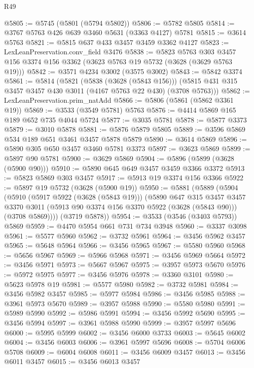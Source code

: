 \begin{lexlean}{R49}
\begin{coremodule}
@5805 := @5745 (@5801 (@5794 @5802))
@5806 := @5782 @5805
@5814 := @3767 @5763 @426 @639 @3460 @5631 (@3363 @4127) @5781
@5815 := @3614 @5763
@5821 := @5815 @637 @433 @3457 @3459 @3362 @4127
@5823 := LexLeanPreservation.conv_field @3476
@5838 := @5823
    @5763
    @303
    @3457
    @156
    @3374
    @156
    @3362
    (@3623 @5763 @19 @5732 (@3628 (@3629 @5763 @19)))
@5842 := @3571 @4234 @3002 (@3575 @3002)
@5843 := @5842 @3374
@5861 := @5814
    (@5821
      (@5838 (@3628 (@5843 @156)))
      (@5815 @431 @315 @3457 @3457 @430 @3011 (@4167 @5763 @22 @430) (@3708 @5763)))
@5862 := LexLeanPreservation.prim_natAdd
@5866 := @5806 (@5861 (@5862 @3361 @19))
@5869 := @3533 (@3549 @5781) @5763
@5876 := @4414 @5869 @165 @189 @652 @735 @4044 @5724
@5877 := @3035 @5781
@5878 := @5877 @3373
@5879 := @3010 @5878
@5881 := @5876 @5879 @5805
@5889 := @3596 @5869 @534 @189 @651 @3461 @3457 @5878 @5879
@5890 := @3614 @5869
@5896 := @5890 @305 @650 @3457 @3460 @5781 @3373
@5897 := @3623 @5869
@5899 := @5897 @90 @5781
@5900 := @3629 @5869
@5904 := @5896 (@5899 (@3628 (@5900 @90)))
@5910 := @5890 @645 @649 @3457 @3459 @3366 @3372
@5913 := @5823 @5869 @303 @3457
@5917 := @5913 @19 @3374 @156 @3366
@5922 := @5897 @19 @5732 (@3628 (@5900 @19))
@5950 := @5881
    (@5889
      (@5904
        (@5910
          (@5917 @5922 (@3628 (@5843 @19)))
          (@5890
            @647
            @315
            @3457
            @3457
            @3370
            @3011
            (@5913 @90 @3374 @156 @3370 @5922 (@3628 (@5843 @90)))
            (@3708 @5869))))
      (@3719 @5878))
@5954 := @3533 (@3546 (@3403 @5793)) @5869
@5959 := @4470 @5954 @661 @731 @734 @3948
@5960 := @3337 @3098
@5961 := @5577 @5960
@5962 := @3732 @5961
@5964 := @3456 @5962 @3457
@5965 := @5648 @5964
@5966 := @3456 @5965
@5967 := @5580 @5960
@5968 := @5656 @5967
@5969 := @5966 @5968
@5971 := @3456 @5969 @5664
@5972 := @3456 @5971
@5973 := @5667 @5967
@5975 := @3957 @5973 @5670
@5976 := @5972 @5975
@5977 := @3456 @5976
@5978 := @3360 @3101
@5980 := @5623 @5978 @19
@5981 := @5577 @5980
@5982 := @3732 @5981
@5984 := @3456 @5982 @3457
@5985 := @5977 @5984
@5986 := @3456 @5985
@5988 := @3961 @5973 @5670
@5989 := @3957 @5988
@5990 := @5580 @5980
@5991 := @5989 @5990
@5992 := @5986 @5991
@5994 := @3456 @5992 @5690
@5995 := @3456 @5994
@5997 := @3961 @5988 @5990
@5999 := @3957 @5997 @5696
@6000 := @5995 @5999
@6002 := @3456 @6000 @3733
@6003 := @5645 @6002
@6004 := @3456 @6003
@6006 := @3961 @5997 @5696
@6008 := @5704 @6006 @5708
@6009 := @6004 @6008
@6011 := @3456 @6009 @3457
@6013 := @3456 @6011 @3457
@6015 := @3456 @6013 @3457

\end{coremodule}
\end{lexlean}
